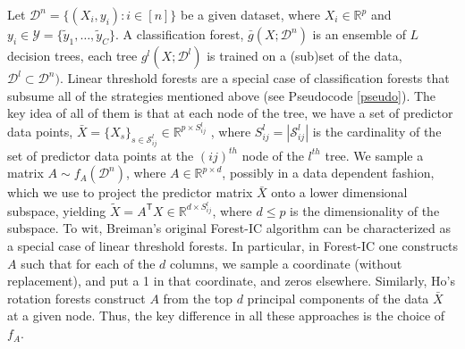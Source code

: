 \documentclass{article}
\newcommand{\Real}{\mathbb{R}}
\providecommand{\mc}[1]{\mathcal{#1}}
\providecommand{\mt}[1]{\widetilde{#1}}
\newcommand{\T}{^{\ensuremath{\mathsf{T}}}}           %
\begin{document}
Let $\mc{D}^n=\{(X_i,y_i): i \in [n]\}$ be a given dataset, where $X_i \in \Real^p$ and $y_i \in \mc{Y} = \{\mt{y}_1,\ldots, \mt{y}_C\}$.  A classification forest, $\bar{g}(X; \mc{D}^n)$ is an ensemble of $L$ decision trees, each tree $g^l( X; \mc{D}^l)$  is trained on a (sub)set of the data, $\mc{D}^l \subset \mc{D}^n)$.
Linear threshold forests are a special case of classification forests that subsume all of the strategies mentioned above (see Pseudocode \ref{pseudo}).  The key idea of all of them is that at each node of the tree, we have a set of predictor data points, $\bar{X}=\{X_s\}_{s \in \mc{S}^l_{ij}} \in \Real^{p \times S^l_{ij}}$ , where  $S^l_{ij}=|\mc{S}^l_{ij}|$ is the cardinality of the set of predictor data points at the $(ij)^{th}$ node of the $l^{th}$ tree.
We sample a  matrix $A \sim f_A(\mc{D}^n)$, where $A \in \Real^{p \times d}$, possibly in a data dependent fashion, which we use to project the predictor matrix $\bar{X}$ onto a lower dimensional subspace, yielding $\mt{X} = A\T X \in \Real^{d \times S^l_{ij}}$, where $d \leq p$ is the dimensionality of the subspace.  To wit, Breiman's original Forest-IC algorithm can be characterized as a special case of linear threshold forests.  In particular, in Forest-IC one constructs $A$ such that for each of the $d$ columns, we sample a coordinate (without replacement), and put a 1 in that coordinate, and zeros elsewhere. Similarly, Ho's rotation forests construct $A$ from the top $d$ principal components of the data $\bar{X}$ at a given node.  Thus, the key difference in all these approaches is the choice of $f_A$. 
\end{document}
